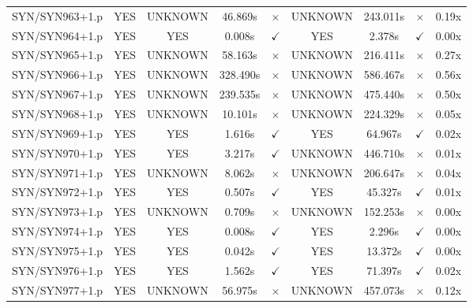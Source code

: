 \documentclass[a4paper,10pt]{article}
\begin{document}
\begin{longtable}{lcccccccc}
SYN/SYN963+1.p & YES & UNKNOWN & 46.869s & \cellcolor{mismatchcolor}$\times$ & UNKNOWN & 243.011s & \cellcolor{mismatchcolor}$\times$ & 0.19x \\
SYN/SYN964+1.p & YES & YES & 0.008s & \cellcolor{matchcolor}$\checkmark$ & YES & 2.378s & \cellcolor{matchcolor}$\checkmark$ & 0.00x \\
SYN/SYN965+1.p & YES & UNKNOWN & 58.163s & \cellcolor{mismatchcolor}$\times$ & UNKNOWN & 216.411s & \cellcolor{mismatchcolor}$\times$ & 0.27x \\
SYN/SYN966+1.p & YES & UNKNOWN & 328.490s & \cellcolor{mismatchcolor}$\times$ & UNKNOWN & 586.467s & \cellcolor{mismatchcolor}$\times$ & 0.56x \\
SYN/SYN967+1.p & YES & UNKNOWN & 239.535s & \cellcolor{mismatchcolor}$\times$ & UNKNOWN & 475.440s & \cellcolor{mismatchcolor}$\times$ & 0.50x \\
SYN/SYN968+1.p & YES & UNKNOWN & 10.101s & \cellcolor{mismatchcolor}$\times$ & UNKNOWN & 224.329s & \cellcolor{mismatchcolor}$\times$ & 0.05x \\
SYN/SYN969+1.p & YES & YES & 1.616s & \cellcolor{matchcolor}$\checkmark$ & YES & 64.967s & \cellcolor{matchcolor}$\checkmark$ & 0.02x \\
SYN/SYN970+1.p & YES & YES & 3.217s & \cellcolor{matchcolor}$\checkmark$ & UNKNOWN & 446.710s & \cellcolor{mismatchcolor}$\times$ & 0.01x \\
SYN/SYN971+1.p & YES & UNKNOWN & 8.062s & \cellcolor{mismatchcolor}$\times$ & UNKNOWN & 206.647s & \cellcolor{mismatchcolor}$\times$ & 0.04x \\
SYN/SYN972+1.p & YES & YES & 0.507s & \cellcolor{matchcolor}$\checkmark$ & YES & 45.327s & \cellcolor{matchcolor}$\checkmark$ & 0.01x \\
SYN/SYN973+1.p & YES & UNKNOWN & 0.709s & \cellcolor{mismatchcolor}$\times$ & UNKNOWN & 152.253s & \cellcolor{mismatchcolor}$\times$ & 0.00x \\
SYN/SYN974+1.p & YES & YES & 0.008s & \cellcolor{matchcolor}$\checkmark$ & YES & 2.296s & \cellcolor{matchcolor}$\checkmark$ & 0.00x \\
SYN/SYN975+1.p & YES & YES & 0.042s & \cellcolor{matchcolor}$\checkmark$ & YES & 13.372s & \cellcolor{matchcolor}$\checkmark$ & 0.00x \\
SYN/SYN976+1.p & YES & YES & 1.562s & \cellcolor{matchcolor}$\checkmark$ & YES & 71.397s & \cellcolor{matchcolor}$\checkmark$ & 0.02x \\
SYN/SYN977+1.p & YES & UNKNOWN & 56.975s & \cellcolor{mismatchcolor}$\times$ & UNKNOWN & 457.073s & \cellcolor{mismatchcolor}$\times$ & 0.12x \\

\end{longtable}
\end{document}
